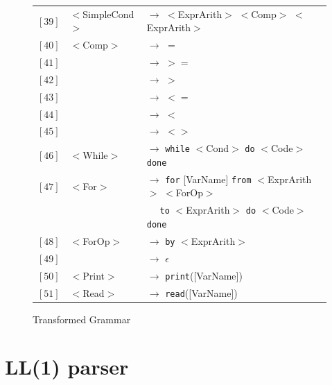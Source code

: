 \documentclass[letterpaper]{article}
\begin{document}
\begin{figure}[H]
\begin{center}
\begin{tabular}{r l l}
                $[39]$ & $<$SimpleCond$>$ & $\rightarrow$
                $<$ExprArith$>$ $<$Comp$>$ $<$ExprArith$>$ \\
                $[40]$ & $<$Comp$>$ & $\rightarrow$ $=$ \\
                $[41]$ & & $\rightarrow$ $>=$ \\
                $[42]$ & & $\rightarrow$ $>$ \\
                $[43]$ & & $\rightarrow$ $<=$ \\
                $[44]$ & & $\rightarrow$ $<$ \\
                $[45]$ & & $\rightarrow$ $<>$ \\

                $[46]$ & $<$While$>$ & $\rightarrow$
                \texttt{while} $<$Cond$>$ \texttt{do}
                $<$Code$>$ \texttt{done} \\
                $[47]$ & $<$For$>$ & $\rightarrow$
                \texttt{for} [VarName] \texttt{from}
                $<$ExprArith$>$ $<$ForOp$>$ \\
                & &
                $\quad$ \texttt{to} $<$ExprArith$>$
                \texttt{do} $<$Code$>$ \texttt{done} \\
                $[48]$ & $<$ForOp$>$ & $\rightarrow$
                \texttt{by} $<$ExprArith$>$ \\
                $[49]$ & & $\rightarrow$ $\epsilon$ \\
                $[50]$ & $<$Print$>$ & $\rightarrow$
                \texttt{print}([VarName]) \\
                $[51]$ & $<$Read$>$ & $\rightarrow$ \texttt{read}([VarName]) \\



            \end{tabular}

    \end{center}
    \caption{Transformed Grammar}
    \label{fig:fullcfg}
\end{figure}

\section{LL(1) parser}
\end{document}
